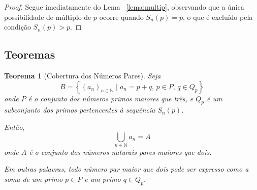 \documentclass[a4paper,11pt]{article}
\newtheorem{theorem}{Teorema}[section]
\theoremstyle{definition}
\theoremstyle{remark}
\begin{document}
	\begin{proof}
		Segue imediatamente do Lema ~\ref{lema:multip}, observando que a única possibilidade de múltiplo de \(p\) ocorre quando \(S_n(p) = p\), o que é excluído pela condição \(S_n(p) > p\).
	\end{proof}
	\subsection{Teoremas}
	\begin{theorem}[Cobertura dos Números Pares]
		Seja 
		\[
		B = \left\{ (a_n)_{n \in \mathbb{N}} \mid a_n = p + q, \, p \in P, \, q \in Q_p \right\}
		\]
		onde \(P\) é o conjunto dos números primos maiores que três, e \(Q_p\) é um subconjunto dos primos pertencentes à sequência \(S_n(p)\). 
		
		Então,
		\[
		\bigcup_{n \in \mathbb{N}} a_n = A
		\]
		onde \(A\) é o conjunto dos números naturais pares maiores que dois.
		
		Em outras palavras, todo número par maior que dois pode ser expresso como a soma de um primo \(p \in P\) e um primo \(q \in Q_p\).
	\end{theorem}
	
\end{document}
